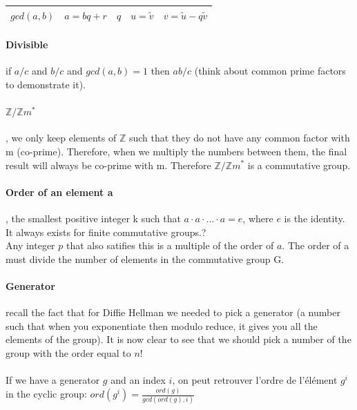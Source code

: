 \documentclass{article}
\begin{document}
\begin{table}[h]
    \centering
    \begin{tabular}{|c|c|c|c|c|}
        \hline
        $ gcd(a,b) $ & $a = bq + r$ & $q$ & $u = \tilde{v}$ & $v = \tilde{u} - q\tilde{v} $ \\
        \hline
    \end{tabular}
    \label{tab:my_label}
\end{table}

\paragraph{Divisible} if $a/c$ and $b/c$ and $gcd(a, b) = 1$ then $ab/c$ (think about common prime factors to demonstrate it).

\paragraph{$\mathbb{Z}/\mathbb{Z}m^*$}, we only keep elements of $ \mathbb{Z} $ such that they do not have any common factor with m (co-prime). Therefore, when we multiply the numbers between them, the final result will always be co-prime with m. Therefore $\mathbb{Z}/\mathbb{Z}m^*$ is a commutative group.

\paragraph{Order of an element a}, the smallest positive integer k such that $ a \cdot a \cdot ... \cdot a  = e $, where $ e $ is the identity. It always exists for finite commutative groups.?\\
Any integer $p$ that also satifies this is a multiple of the order of $a$. The order of a must divide the number of elements in the commutative group G.

\paragraph{Generator} recall the fact that for Diffie Hellman we needed to pick a generator (a number such that when you exponentiate then modulo reduce, it gives you all the elements of the group). It is now clear to see that we should pick a number of the group with the order equal to $n$!\\\\
If we have a generator $g$ and an index $i$, on peut retrouver l'ordre de l'élément $g^i$ in the cyclic group: $ord(g^i) = \frac{ord(g)}{gcd(ord(g), i)}$
\end{document}
